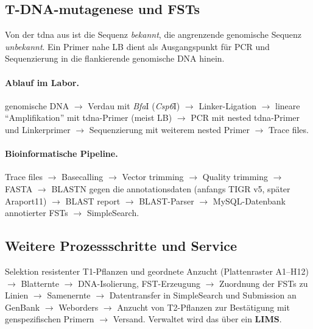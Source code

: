 \subsection*{T-DNA-\gls{mutagenese} und FSTs}\label{subsec:t-dna-mutagenese-und-fsts}
Von der \gls{tdna} aus ist die Sequenz \emph{bekannt}, die angrenzende genomische Sequenz \emph{unbekannt}.
Ein Primer nahe LB dient als Ausgangspunkt für PCR und Sequenzierung in die flankierende genomische DNA hinein.

\paragraph{Ablauf im Labor.}
genomische DNA $\to$ Verdau mit \emph{Bfa}I (\emph{Csp6}I) $\to$ Linker-Ligation $\to$ lineare ``Amplifikation'' mit \gls{tdna}-Primer (meist LB) $\to$ PCR mit nested \gls{tdna}-Primer und Linkerprimer $\to$ Sequenzierung mit weiterem nested Primer $\to$ Trace files.

\paragraph{Bioinformatische Pipeline.}
Trace files $\to$ Basecalling $\to$ Vector trimming $\to$ Quality trimming $\to$ FASTA $\to$ BLASTN gegen die \gls{annotation}sdaten (anfangs TIGR v5, später Araport11) $\to$ BLAST report $\to$ BLAST-Parser $\to$ MySQL-Datenbank annotierter FSTs $\to$ SimpleSearch.


\subsection*{Weitere Prozessschritte und Service}\label{subsec:weitere-prozessschritte-und-service}
Selektion resistenter T1-Pflanzen und geordnete Anzucht (Plattenraster A1--H12) $\to$ Blatternte $\to$ DNA-Isolierung, FST-Erzeugung $\to$ Zuordnung der FSTs zu Linien $\to$ Samenernte $\to$ Datentransfer in SimpleSearch und Submission an GenBank $\to$ Weborders $\to$ Anzucht von T2-Pflanzen zur Bestätigung mit genspezifischen Primern $\to$ Versand.
Verwaltet wird das über ein \textbf{LIMS}.

